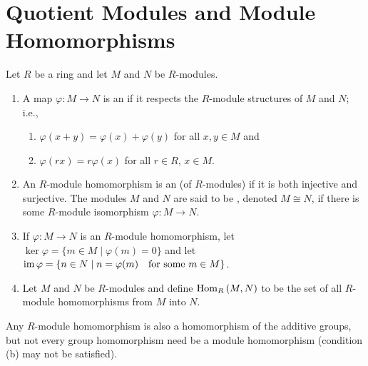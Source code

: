 \section{Quotient Modules and Module Homomorphisms}\label{sec:quotient-homoms}
    \begin{definition}\label{def:module-homomorphism}
        Let $R$ be a ring and let $M$ and $N$ be $R$-modules.
        \begin{enumerate}[label=(\arabic*)]
            \item A map $\varphi:M \rightarrow N$ is an  if it respects the $R$-module structures of $M$ and $N$; i.e.,
            \begin{enumerate}[label=(\alph*)]
                \item $\varphi(x+y) = \varphi(x) + \varphi(y)$ for all $x,y \in M$ and
                \item $\varphi(rx) = r\varphi(x)$ for all $r \in R$, $x \in M$.
            \end{enumerate}
            \item An $R$-module homomorphism is an  (of $R$-modules) if it is both injective and surjective. The modules $M$ and $N$ are said to be , denoted $M \cong N$, if there is some $R$-module isomorphism $\varphi:M \rightarrow N$.
            \item If $\varphi:M\rightarrow N$ is an $R$-module homomorphism, let $\ker{\varphi} = \{m \in M \mid \varphi(m) = 0\}$ and let $\operatorname{im}{\varphi}=\{n \in N \mid n = \varphi(m)\quad\text{for some $m \in M$}\}$.
            \item Let $M$ and $N$ be $R$-modules and define $\operatorname{Hom}_R{(M,N)}$ to be the set of all $R$-module homomorphisms from $M$ into $N$.
        \end{enumerate}
    \end{definition}

    \begin{note}
        Any $R$-module homomorphism is also a homomorphism of the additive groups, but not every group homomorphism need be a module homomorphism (condition (b) may not be satisfied).
    \end{note}

